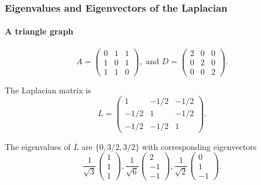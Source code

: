 \documentclass[aspectratio=43,leqno]{beamer}
\begin{document}
\begin{frame}
  \frametitle{Eigenvalues and Eigenvectors of the Laplacian}
  \framesubtitle{A triangle graph}
\begin{displaymath}
  A = \begin{pmatrix} 0 & 1 & 1 \\ 1 & 0 & 1 \\ 1 & 1 & 0 \end{pmatrix},
  \text{ and }
  D = \begin{pmatrix} 2 & 0 & 0 \\ 0 & 2 & 0 \\ 0 & 0 & 2 \end{pmatrix}.
\end{displaymath}
\pause

The Laplacian matrix is 
\begin{displaymath}
  L = \begin{pmatrix} 1 & -1/2 & -1/2 \\ -1/2 & 1 & -1/2 \\ -1/2 & -1/2 & 1 \end{pmatrix}. 
\end{displaymath}
\pause

The eigenvalues of $\overline{L}$ are $\{ 0, 3/2, 3/2 \}$ with corresponding eigenvectors
\begin{displaymath}
  \frac{1}{\sqrt{3}} \begin{pmatrix} 1 \\ 1 \\ 1 \end{pmatrix},
  \frac{1}{\sqrt{6}} \begin{pmatrix} 2 \\ -1 \\ -1 \end{pmatrix},
  \frac{1}{\sqrt{2}} \begin{pmatrix} 0 \\ 1 \\ -1 \end{pmatrix}.
\end{displaymath}

\end{frame}
\end{document}
